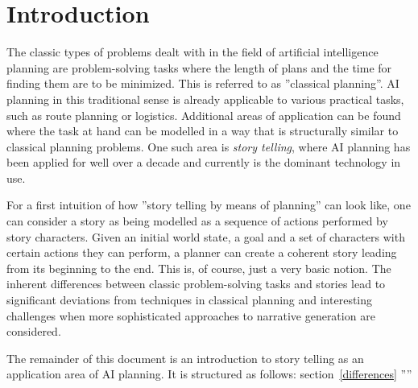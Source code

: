 \section{Introduction}
The classic types of problems dealt with in the field of artificial intelligence planning are problem-solving tasks where the length of plans and the time for finding them are to be minimized. This is referred to as ''classical planning''. AI planning in this traditional sense is already applicable to various practical tasks, such as route planning or logistics. Additional areas of application can be found where the task at hand can be modelled in a way that is structurally similar to classical planning problems. One such area is \emph{story telling}, where AI planning has been applied for well over a decade and currently is the dominant technology in use\cite{Porteous10}.

For a first intuition of how ''story telling by means of planning'' can look like, one can consider a story as being modelled as a sequence of actions performed by story characters. Given an initial world state, a goal and a set of characters with certain actions they can perform, a planner can create a coherent story leading from its beginning to the end. This is, of course, just a very basic notion. The inherent differences between classic problem-solving tasks and stories lead to significant deviations from techniques in classical planning and interesting challenges when more sophisticated approaches to narrative generation are considered.

The remainder of this document is an introduction to story telling as an application area of AI planning. It is structured as follows: section~\ref{differences} '''' 

